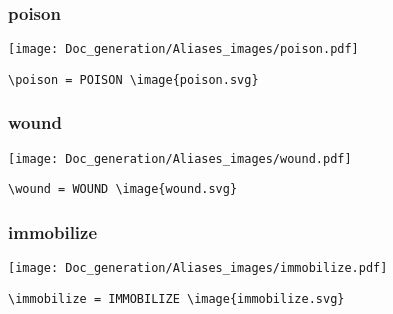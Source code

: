 \documentclass{article}
\begin{document}
\subsubsection{poison}
\begin{minipage}{0.45\linewidth}
\raggedright
\begin{spverbatim}
\poison
\end{spverbatim}
\end{minipage}
\begin{minipage}{0.45\linewidth}
\raggedleft
\texttt{[image: Doc\_generation/Aliases\_images/poison.pdf]}
\end{minipage}
\begin{center}
\begin{BVerbatim}
\poison = POISON \image{poison.svg}
\end{BVerbatim}
\end{center}

\subsubsection{wound}
\begin{minipage}{0.45\linewidth}
\raggedright
\begin{spverbatim}
\wound
\end{spverbatim}
\end{minipage}
\begin{minipage}{0.45\linewidth}
\raggedleft
\texttt{[image: Doc\_generation/Aliases\_images/wound.pdf]}
\end{minipage}
\begin{center}
\begin{BVerbatim}
\wound = WOUND \image{wound.svg}
\end{BVerbatim}
\end{center}

\subsubsection{immobilize}
\begin{minipage}{0.45\linewidth}
\raggedright
\begin{spverbatim}
\immobilize
\end{spverbatim}
\end{minipage}
\begin{minipage}{0.45\linewidth}
\raggedleft
\texttt{[image: Doc\_generation/Aliases\_images/immobilize.pdf]}
\end{minipage}
\begin{center}
\begin{BVerbatim}
\immobilize = IMMOBILIZE \image{immobilize.svg}
\end{BVerbatim}
\end{center}
\end{document}
